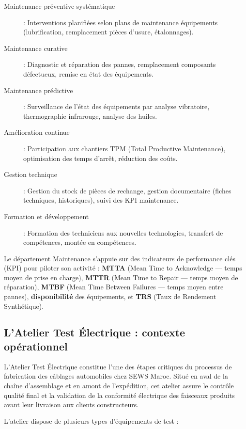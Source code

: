 \begin{description}
    \item[Maintenance préventive systématique] : Interventions planifiées selon plans de maintenance équipements (lubrification, remplacement pièces d'usure, étalonnages).
    \item[Maintenance curative] : Diagnostic et réparation des pannes, remplacement composants défectueux, remise en état des équipements.
    \item[Maintenance prédictive] : Surveillance de l'état des équipements par analyse vibratoire, thermographie infrarouge, analyse des huiles.
    \item[Amélioration continue] : Participation aux chantiers TPM (Total Productive Maintenance), optimisation des temps d'arrêt, réduction des coûts.
    \item[Gestion technique] : Gestion du stock de pièces de rechange, gestion documentaire (fiches techniques, historiques), suivi des KPI maintenance.
    \item[Formation et développement] : Formation des techniciens aux nouvelles technologies, transfert de compétences, montée en compétences.
\end{description}

Le département Maintenance s'appuie sur des indicateurs de performance clés (KPI) pour piloter son activité : \textbf{MTTA} (Mean Time to Acknowledge --- temps moyen de prise en charge), \textbf{MTTR} (Mean Time to Repair --- temps moyen de réparation), \textbf{MTBF} (Mean Time Between Failures --- temps moyen entre pannes), \textbf{disponibilité} des équipements, et \textbf{TRS} (Taux de Rendement Synthétique).

\subsection{L'Atelier Test Électrique : contexte opérationnel}

L'Atelier Test Électrique constitue l'une des étapes critiques du processus de fabrication des câblages automobiles chez SEWS Maroc. Situé en aval de la chaîne d'assemblage et en amont de l'expédition, cet atelier assure le contrôle qualité final et la validation de la conformité électrique des faisceaux produits avant leur livraison aux clients constructeurs.

L'atelier dispose de plusieurs types d'équipements de test :

